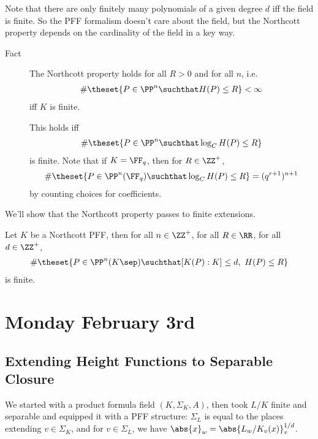 Note that there are only finitely many polynomials of a given degree
\(d\) iff the field is finite. So the PFF formalism doesn't care about
the field, but the Northcott property depends on the cardinality of the
field in a key way.

\begin{description}
\item[Fact]
The Northcott property holds for all \(R> 0\) and for all \(n\), i.e.~
\begin{align*}
\#\theset{P\in \PP^n \suchthat H(P) \leq R} < \infty
\end{align*} iff \(K\) is finite.

This holds iff
\begin{align*}\#\theset{P\in \PP^n \suchthat \log_C H(P) \leq R}\end{align*}
is finite. Note that if \(K = \FF_q\), then for \(R\in \ZZ^+\),
\begin{align*}
\#\theset{P \in \PP^n(\FF_q) \suchthat \log_C H(P) \leq R} = (q^{r+1})^{n+1}
\end{align*} by counting choices for coefficients.
\end{description}

We'll show that the Northcott property passes to finite extensions.

\begin{description}
\tightlist
\item[Theorem (Finiteness for Northcott PFFs)]
Let \(K\) be a Northcott PFF, then for all \(n\in \ZZ^+\), for all
\(R\in \RR\), for all \(d\in \ZZ^+\),
\begin{align*}
\#\theset{ P \in \PP^n(K\sep) \suchthat [K(P): K] \leq d,~H(P) \leq R  }
\end{align*} is finite.
\end{description}

\hypertarget{monday-february-3rd}{%
\section{Monday February 3rd}\label{monday-february-3rd}}

\hypertarget{extending-height-functions-to-separable-closure}{%
\subsection{Extending Height Functions to Separable
Closure}\label{extending-height-functions-to-separable-closure}}

We started with a product formula field \((K, \Sigma_K, A)\), then took
\(L/K\) finite and separable and equipped it with a PFF structure:
\(\Sigma_L\) is equal to the places extending \(v\in \Sigma_K\), and for
\(v\in \Sigma_L\), we have \(\abs{x}_w = \abs{L_w/K_v (x) }_v^{1/d}\).

